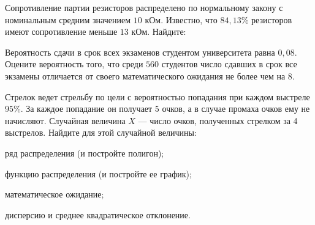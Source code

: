 \vfil

\begin{zkrPlain}{25}\noindent 
	Сопротивление партии резисторов распределено по нормальному закону с номинальным средним значением $10$ кОм. Известно, что $84{,}13\%$ резисторов имеют сопротивление меньше $13$ кОм. Найдите: \par {}
 
\end{zkrPlain}

\vfil

\begin{zkrPlain}{25}\noindent 
	Вероятность сдачи в срок всех экзаменов студентом университета равна $ 0{,}08 $. Оцените вероятность того, что среди $ 560 $ студентов число сдавших в срок все экзамены отличается от своего математического ожидания не более чем на $ 8 $. 
 
\end{zkrPlain}

\newpage\setcounter{zad}{0}\setcounter{footnote}{0}



\begin{zkrPlain}{25}\noindent 
	Стрелок ведет стрельбу по цели с вероятностью попадания при каждом выстреле $95\%$. За каждое попадание он получает 5 очков, а в случае промаха очков ему не начисляют. Случайная величина $X$ --- число очков, полученных стрелком за 4 выстрелов.  Найдите для этой случайной величины: \par \smallskip\small{ \par \zz ряд распределения (и постройте полигон); \par \zz функцию распределения (и постройте ее график); \par \zz математическое ожидание; \par \zz дисперсию и среднее квадратическое отклонение.\par \par}
 
\end{zkrPlain}

\vfil

